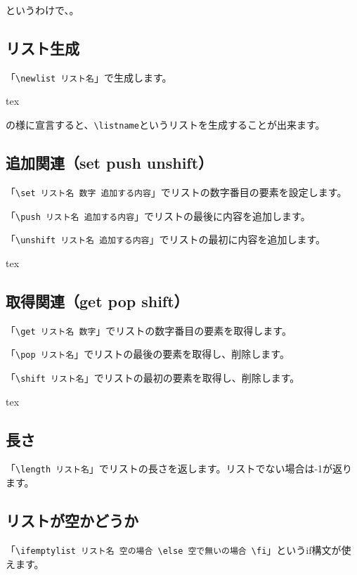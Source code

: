 というわけで、。

\subsection{リスト生成}
「\verb+\newlist リスト名+」で生成します。

\begin{code}{tex}
  \newlist \listname
\end{code}
の様に宣言すると、\verb+\listname+というリストを生成することが出来ます。


\subsection{追加関連（set push unshift）}
「\verb+\set リスト名 数字 追加する内容+」でリストの数字番目の要素を設定します。

「\verb+\push リスト名 追加する内容+」でリストの最後に内容を追加します。

「\verb+\unshift リスト名 追加する内容+」でリストの最初に内容を追加します。

\begin{code}{tex}
\set{} {}
\push{}
\unshift{}
\end{code}


\subsection{取得関連（get pop shift）}
「\verb+\get リスト名 数字+」でリストの数字番目の要素を取得します。

「\verb+\pop リスト名+」でリストの最後の要素を取得し、削除します。

「\verb+\shift リスト名+」でリストの最初の要素を取得し、削除します。


\begin{code}{tex}
\get {}
\pop\listname
\shift\listname
\end{code}




\subsection{長さ}
「\verb+\length リスト名+」でリストの長さを返します。リストでない場合は-1が返ります。

\subsection{リストが空かどうか}
「\verb+\ifemptylist リスト名 空の場合 \else 空で無いの場合 \fi+」というif構文が使えます。


